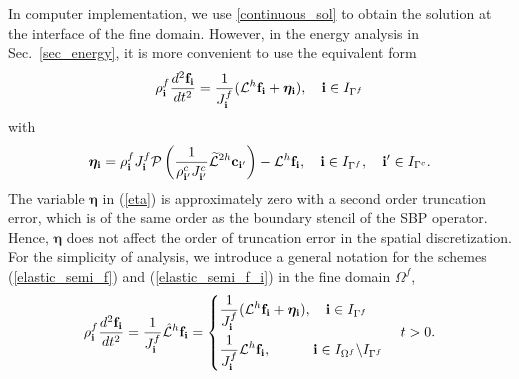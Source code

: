 In computer implementation, we use \eqref{continuous_sol} to obtain the solution at the interface of the fine domain. However, in the energy analysis in  Sec.~\ref{sec_energy}, it is more convenient to use the equivalent form
\begin{equation}\label{elastic_semi_f_i}
{\rho}^f_{\bf i} \frac{d^2{\bf f}_{\bf i}}{dt^2} =
\frac{1}{J^f_{\bf i}}(\mathcal{L}^h{\bf f}_{\bf i} + {\bm \eta}_{\bf i}), \quad {\bf i}\in I_{\Gamma^f}
\end{equation}
with 
\begin{equation}\label{eta}
{\bm \eta}_{\bf i} = {\rho}^f_{\bf i}J^f_{\bf i}{\mathcal{P}}\left(\frac{1}{\rho^c_{{\bf i}'}J^c_{{\bf i}'}}\wt{\mathcal{L}}^{2h} {\bf c}_{{\bf i}'}\right) - \mathcal{L}^{h}{\bf f}_{\bf i}, \quad {\bf i}\in I_{\Gamma^f},\quad {{\bf i}'}\in I_{\Gamma^c}.
\end{equation}
The variable $\bm \eta$ in (\ref{eta}) is approximately zero with a second order truncation error, which is of the same order as the boundary stencil of the SBP operator. Hence,  $\bm \eta$ does not affect the order of truncation error in the spatial discretization. %
For the simplicity of analysis, we introduce a general notation for the schemes (\ref{elastic_semi_f}) and (\ref{elastic_semi_f_i}) in the fine domain $\Omega^f$,
\begin{align}\label{fine_scheme}
{\rho}^f_{\bf i}\frac{d^2{\bf f}_{\bf i}}{dt^2} =\frac{1}{J^f_{\bf i}}\hat{\mathcal{L}}^h{\bf f}_{\bf i} = \left\{
\begin{aligned}
&\frac{1}{J^f_{\bf i}}(\mathcal{L}^h{\bf f}_{\bf i} +{\bm \eta}_{\bf i}), \quad {\bf i}\in I_{\Gamma^f}\\
&\frac{1}{J^f_{\bf i}}\mathcal{L}^h{\bf f}_{\bf i},\quad\quad\quad {\bf i}\in I_{\Omega^f}\backslash I_{\Gamma^f} 
\end{aligned}
\right. \quad t > 0.
\end{align}

